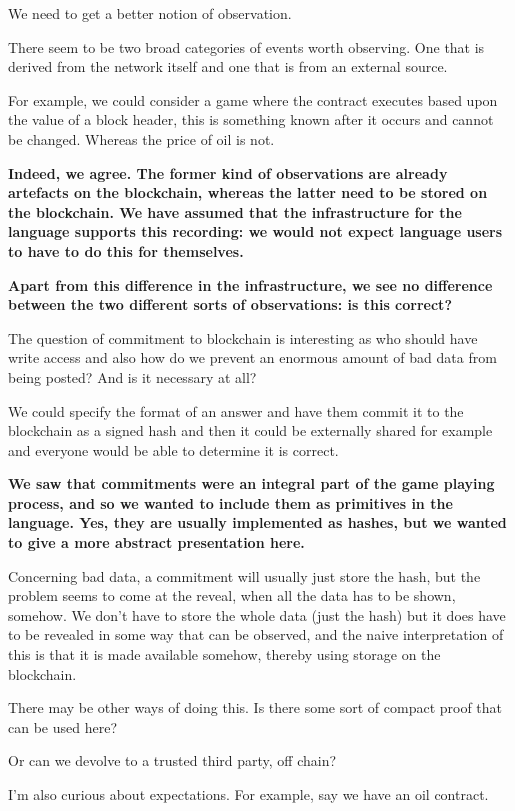 \documentclass[
      acmsmall
    , screen
    , review=true
  ]{acmart}
\begin{document}
We need to get a better notion of observation. 


There seem to be two broad categories of events worth observing. One that is derived from the network itself and one that is from an external source. 


For example, we could consider a game where the contract executes based upon the value of a block header, this is something known after it occurs and cannot be changed.
Whereas the price of oil is not.



{\bf
Indeed, we agree. The former kind of observations are already artefacts on the blockchain, whereas the latter need to be stored on the blockchain. We have assumed that the infrastructure for the language supports this recording: we would not expect language users to have to do this for themselves.
}

{\bf
Apart from this difference in the infrastructure, we see no difference between the two different sorts of observations: is this correct?
}

The question of commitment to blockchain is interesting as who should have write access and also how do we prevent an enormous amount of bad data from being posted? And is it necessary at all?


We could specify the format of an answer and have them commit it to the blockchain as a signed hash and then it could be externally shared for example and everyone would be able to determine it is correct.

{\bf
We saw that commitments were an integral part of the game playing process, and so we wanted to include them as primitives in the language. Yes, they are usually implemented as hashes, but we wanted to give a more abstract presentation here. 


Concerning bad data, a commitment will usually just store the hash, but the problem seems to come at the reveal, when all the data has to be shown, somehow. We don't have to store the whole data (just the hash) but it does have to be revealed in some way that can be observed, and the naive interpretation of this is that it is made available somehow, thereby using storage on the blockchain.


There may be other ways of doing this. Is there some sort of compact proof that can be used here?


Or can we devolve to a trusted third party, off chain?
}

I'm also curious about expectations. For example, say we have an oil contract.
\end{document}
